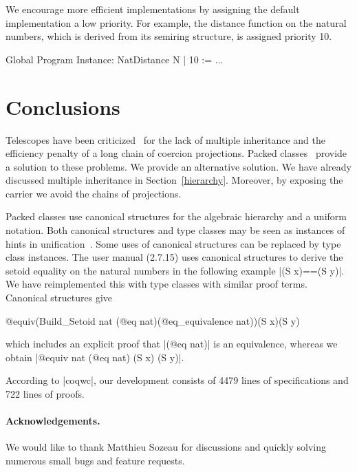 \documentclass{llncs}
\begin{document}
We encourage more efficient implementations by assigning the default implementation a
low priority. For example, the distance function on the natural numbers, which is derived from its
semiring structure, is assigned priority 10.
\begin{code}
  Global Program Instance: NatDistance N | 10 := ...
\end{code}

\section{Conclusions}
Telescopes have been criticized~\cite{Packed} for the lack of multiple inheritance and
the efficiency penalty of a long chain of coercion projections. Packed classes~\cite{Packed} provide
a solution to these problems. We provide an alternative solution. We have already
discussed multiple inheritance in Section~\ref{hierarchy}. Moreover, by exposing the
carrier we avoid the chains of projections.

Packed classes use canonical structures for the algebraic hierarchy and a uniform notation. Both
canonical structures and
type classes may be seen as instances of hints in unification~\cite{Hints}. Some uses of canonical
structures can be replaced by type class instances. The user manual (2.7.15) uses canonical
structures to derive the setoid equality on the natural
numbers in the following example |(S x)==(S y)|. We have reimplemented this with
type classes with similar proof terms. Canonical structures give
\begin{code}
@equiv(Build_Setoid nat (@eq nat)(@eq_equivalence nat))(S x)(S y)
\end{code}

which includes an explicit proof that |(@eq nat)| is an equivalence,
whereas we obtain |@equiv nat (@eq nat) (S x) (S y)|.

According to |coqwc|, our development consists of 4479 lines of specifications and 722 lines of
proofs.

\paragraph{Acknowledgements.}
We would like to thank Matthieu Sozeau for discussions and quickly solving numerous small bugs and
feature requests. 


\end{document}
